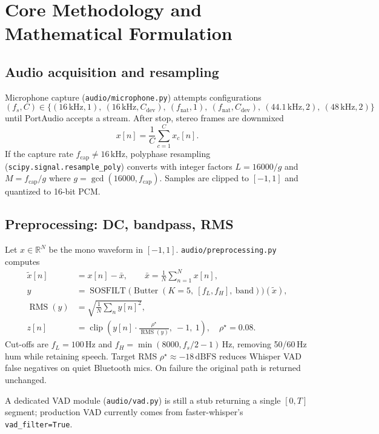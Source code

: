 \documentclass[11pt,a4paper]{article}
\begin{document}
\section{Core Methodology and Mathematical Formulation}

\subsection{Audio acquisition and resampling}
Microphone capture (\texttt{audio/microphone.py}) attempts configurations
\[
  (f_s, C) \in \bigl\{(16\,\text{kHz},1),\ (16\,\text{kHz},C_{\text{dev}}),\ (f_{\text{nat}},1),\ (f_{\text{nat}},C_{\text{dev}}),\ (44.1\,\text{kHz},2),\ (48\,\text{kHz},2)\bigr\}
\]
until PortAudio accepts a stream. After stop, stereo frames are downmixed
\begin{equation}
  x[n] = \frac{1}{C}\sum_{c=1}^{C} x_c[n].
\end{equation}
If the capture rate $f_{\text{cap}} \neq 16\,\text{kHz}$, polyphase resampling (\texttt{scipy.signal.resample\_poly}) converts with integer factors $L=16000/g$ and $M=f_{\text{cap}}/g$ where $g=\gcd(16000,f_{\text{cap}})$. Samples are clipped to $[-1,1]$ and quantized to 16-bit PCM.

\subsection{Preprocessing: DC, bandpass, RMS}
Let $x \in \mathbb{R}^{N}$ be the mono waveform in $[-1,1]$. \texttt{audio/preprocessing.py} computes
\begin{align}
  \tilde{x}[n] &= x[n] - \bar{x}, \qquad \bar{x}=\frac{1}{N}\sum_{n=1}^{N} x[n], \\
  y &= \operatorname{SOSFILT}\bigl(\operatorname{Butter}(K{=}5,\ [f_L,f_H],\ \text{band})\bigr)(\tilde{x}), \\
  \operatorname{RMS}(y) &= \sqrt{\frac{1}{N}\sum_{n} y[n]^2}, \\
  z[n] &= \operatorname{clip}\!\left(y[n]\cdot\frac{\rho^\star}{\operatorname{RMS}(y)},\ -1,\ 1\right),\quad \rho^\star=0.08.
\end{align}
Cut-offs are $f_L=100\,\text{Hz}$ and $f_H=\min(8000, f_s/2-1)$\,Hz, removing 50/60\,Hz hum while retaining speech. Target RMS $\rho^\star \approx -18\,\text{dBFS}$ reduces Whisper VAD false negatives on quiet Bluetooth mics. On failure the original path is returned unchanged.

A dedicated VAD module (\texttt{audio/vad.py}) is still a stub returning a single $[0,T]$ segment; production VAD currently comes from faster-whisper's \texttt{vad\_filter=True}.
\end{document}
